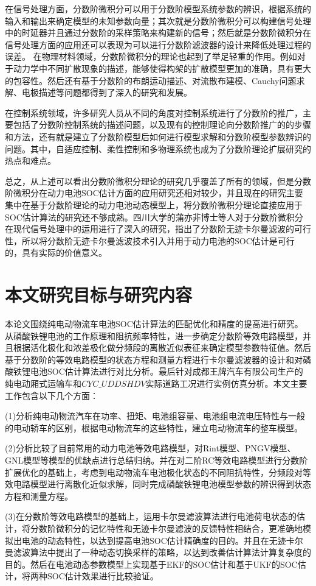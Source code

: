 在信号处理方面，分数阶微积分可以用于分数阶模型系统参数的辨识，根据系统的输入和输出来确定模型的未知参数向量；其次就是分数阶微积分可以构建信号处理中的时延器并且通过分数阶的采样策略来构建新的信号；然后就是分数阶微积分在信号处理方面的应用还可以表现为可以进行分数阶滤波器的设计来降低处理过程的误差。
在物理材料领域，分数阶微积分的理论也起到了举足轻重的作用。例如对于动力学中不同扩散现象的描述，能够使得构架的扩散模型更加的准确，具有更大的包容性。然后还有基于分数阶的布朗运动描述、对流散布建模、Cauchy问题求解、电极描述等问题都得到了深入的研究和发展。

在控制系统领域，许多研究人员从不同的角度对控制系统进行了分数阶的推广，主要包括了分数阶控制系统的描述问题，以及现有的控制理论向分数阶推广的的步骤和方法，还有就是建立了分数阶模型后如何进行模型求解和分数阶模型参数辨识的问题。其中，自适应控制、柔性控制和多物理系统也成为了分数阶理论扩展研究的热点和难点。

总之，从上述可以看出分数阶微积分理论的研究几乎覆盖了所有的领域，但是分数阶微积分在动力电池SOC估计方面的应用研究还相对较少，并且现在的研究主要集中在基于分数阶理论的动力电池动态模型上，将分数阶微积分理论直接应用于SOC估计算法的研究还不够成熟。四川大学的蒲亦非博士等人对于分数阶微积分在现代信号处理中的运用进行了深入的研究，指出了分数阶无迹卡尔曼滤波的可行性，所以将分数阶无迹卡尔曼滤波技术引入并用于动力电池的SOC估计是可行的，具有实际的价值意义。
\section{本文研究目标与研究内容}
本论文围绕纯电动物流车电池SOC估计算法的匹配优化和精度的提高进行研究。从磷酸铁锂电池的工作原理和阻抗频率特性，进一步确定分数阶等效电路模型，并且根据活化极化和浓差极化做分频段的离散近似表征来确定模型参数特征值。然后基于分数阶的等效电路模型的状态方程和测量方程进行卡尔曼滤波器的设计和对磷酸铁锂电池SOC估计算法进行对比分析。最后针对成都王牌汽车有限公司生产的纯电动厢式运输车和$CYC\_UDDSHDV$实际道路工况进行实例仿真分析。本文主要工作包含以下几个方面：

(1)分析纯电动物流汽车在功率、扭矩、电池组容量、电池组电流电压特性与一般的电动轿车的区别，根据电动物流车的这些特性，建立电动物流车的整车模型。

(2)分析比较了目前常用的动力电池等效电路模型，对Rint模型、PNGV模型、GNL模型等模型的优缺点进行总结归纳。并在对二阶RC等效电路模型进行分数阶扩展优化的基础上，考虑到电动物流车电池极化状态的不同阻抗特性，分频段对等效电路模型进行离散化近似求解，同时完成磷酸铁锂电池模型参数的辨识得到状态方程和测量方程。

(3)在分数阶等效电路模型的基础上，运用卡尔曼滤波算法进行电池荷电状态的估计，将分数阶微积分的记忆特性和无迹卡尔曼滤波的反馈特性相结合，更准确地模拟出电池的动态特性，以达到提高电池SOC估计精确度的目的。并且在无迹卡尔曼滤波算法中提出了一种动态切换采样的策略，以达到改善估计算法计算复杂度的目的。然后在电池动态参数模型上实现基于EKF的SOC估计和基于UKF的SOC估计，将两种SOC估计效果进行比较验证。

